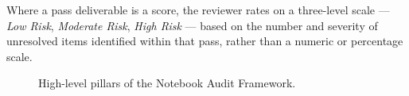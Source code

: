 \documentclass[11pt, a4paper]{article}
\begin{document}
Where a pass deliverable is a score, the reviewer rates on a three-level
scale — \textit{Low Risk}, \textit{Moderate Risk}, \textit{High Risk} —
based on the number and severity of unresolved items identified within
that pass, rather than a numeric or percentage scale.

\begin{figure}[ht]
	\centering
	\caption{High-level pillars of the Notebook Audit Framework.}
	\label{fig:audit-tree}
\end{figure}
\end{document}
